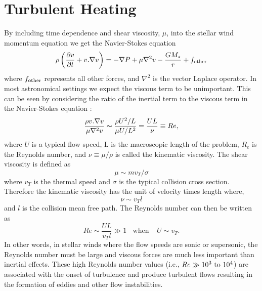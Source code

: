 \chapter{Turbulent Heating}\label{app:4}

By including time dependence and shear viscosity, $\mu$, into the stellar wind momentum equation we get the Navier-Stokes equation
\begin{equation}
\rho \left(\frac{\partial v}{\partial t}+v. \nabla v\right)=-\nabla P + \mu \nabla ^2{v} - \frac{GM_{\star}}{r}+  f_{\rm{other}}
\end{equation} 
where $f_{\rm{other}}$ represents all other forces, and $\nabla ^2$ is the vector Laplace operator. In most astronomical settings we expect the viscous term to be unimportant. This can be seen by considering the ratio of the inertial term to the viscous term in the Navier-Stokes equation \cite{shu_1992}:
\begin{equation}
\frac{\rho v.\nabla v}{\mu \nabla ^2 v} \thicksim \frac{\rho U^2 /L}{\mu U / L^2}=\frac{UL}{\nu} \equiv Re,
\end{equation} 
where $U$ is a typical flow speed, L is the macroscopic length of the problem, $R_{e}$ is the Reynolds number, and $\nu \equiv \mu /\rho$ is called the kinematic viscosity. The shear viscosity is defined as
\begin{equation}
\mu \sim mv_{T}/\sigma
\end{equation} 
where $v_{T}$ is the thermal speed and $\sigma$ is the typical collision cross section. Therefore the kinematic viscosity has the unit of velocity times length where,
\begin{equation}
\nu \sim v_{T}l
\end{equation} 
and $l$ is the collision mean free path. The Reynolds number can then be written as 
\begin{equation}
Re \sim \frac{UL}{v_{T}l} \gg 1 \ \ \ \ \mathrm{when} \ \ \ \ \ U \sim v_{T}.
\end{equation} 
In other words, in stellar winds where the flow speeds are sonic or supersonic, the Reynolds number must be large and viscous forces are much less important than inertial effects. These high Reynolds number values (i.e., $Re \gg 10^3 \ \rm{to} \ 10^4$) are associated with the onset of turbulence \citep{hartquist_1998} and produce turbulent flows resulting in the formation of eddies and other flow instabilities.


